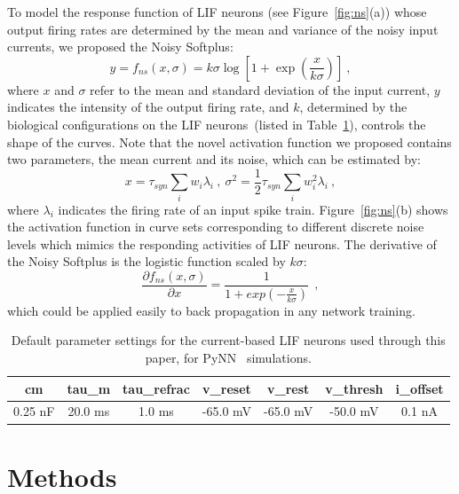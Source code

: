 \documentclass{article}
\begin{document}
To model the response function of LIF neurons (see Figure~\ref{fig:ns}(a)) whose output firing rates are determined by the mean and variance of the noisy input currents, we proposed the Noisy Softplus:
\begin{equation}
y = f_{ns}(x, \sigma) = k \sigma \log [1 + \exp(\frac{x}{k \sigma})]~,
\label{equ:nsp}
\end{equation}
where $x$ and $\sigma$ refer to the mean and standard deviation of the input current, $y$ indicates the intensity of the output firing rate, and $k$, determined by the biological configurations on the LIF neurons~(listed in Table~\ref{tbl:pynnConfig}), controls the shape of the curves.
Note that the novel activation function we proposed contains two parameters, the mean current and its noise, which can be estimated by:
\begin{equation}
x = \tau_{syn}\sum_i w_i\lambda_{i}~, ~\sigma^2=\frac{1}{2}\tau_{syn}\sum_i w_i^2\lambda_{i}~,
\label{equ:distr}
\end{equation}
where $\lambda_i$ indicates the firing rate of an input spike train.
Figure~\ref{fig:ns}(b) shows the activation function in curve sets corresponding to different discrete noise levels which mimics the responding activities of LIF neurons.
The derivative of the Noisy Softplus is the logistic function scaled by $k\sigma$:
\begin{equation}
\frac{\partial f_{ns}(x,\sigma)}{\partial x} = \frac{1}{1+exp(-\frac{x}{k\sigma})}~~,
\label{equ:logist}
\end{equation}	
which could be applied easily to back propagation in any network training.

\begin{table}[thb]
	\centering
	\caption{\label{tbl:pynnConfig}Default parameter settings for the current-based LIF neurons used through this paper, for PyNN~\cite{davison2008pynn} simulations.}
	\bgroup
	\def\arraystretch{1.4}
	\begin{tabular}{c c c c c c c}
		cm & tau\_m & tau\_refrac & v\_reset & v\_rest& v\_thresh & i\_offset \\
		\hline
		0.25 nF & 20.0 ms & 1.0 ms & -65.0 mV & -65.0 mV & -50.0 mV &  0.1 nA 
	\end{tabular}
	\egroup
\end{table}


\section{Methods}	
\label{sec:meth}
\end{document}
